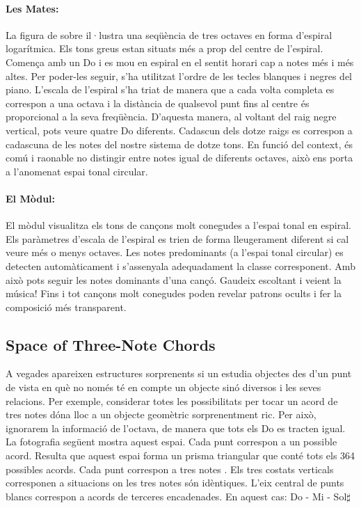 \paragraph{Les Mates:} La figura de sobre il·lustra una seqüència de tres octaves en forma d'espiral logarítmica. Els tons greus estan situats més a prop del centre de l'espiral. Comença amb un Do i es mou en espiral en el sentit horari cap a notes més i més altes. Per poder-les seguir, s'ha utilitzat l'ordre de les tecles blanques i negres del piano. L'escala de l'espiral s'ha triat de manera que a cada volta completa es correspon a una octava i la distància de qualsevol punt fins al centre és proporcional a la seva freqüència. D'aquesta manera, al voltant del raig negre vertical, pots veure quatre Do diferents. Cadascun dels dotze raigs es correspon a cadascuna de les notes del nostre sistema de dotze tons. En funció del context, és comú i raonable no distingir entre notes igual de diferents octaves, això ens porta a l'anomenat espai tonal circular.

\paragraph{El Mòdul:} El mòdul visualitza els tons de cançons molt conegudes a l'espai tonal en espiral. Els paràmetres d'escala de l'espiral es trien de forma lleugerament diferent si cal veure més o menys octaves. Les notes predominants (a l'espai tonal circular) es detecten automàticament i s'assenyala adequadament la classe corresponent. Amb això pots seguir les notes dominants d'una cançó. Gaudeix escoltant i veient la música! Fins i tot cançons molt conegudes poden revelar patrons ocults i fer la composició més transparent.

\subsection{Space of Three-Note Chords}
A vegades apareixen estructures sorprenents si un estudia objectes des d'un punt de vista en què no només té en compte un objecte sinó diversos i les seves relacions. Per exemple, considerar totes les possibilitats per tocar un acord de tres notes dóna lloc a un objecte geomètric sorprenentment ric. Per això, ignorarem la informació de l'octava, de manera que tots els Do es tracten igual. La fotografia següent mostra aquest espai. Cada punt correspon a un possible acord. Resulta que aquest espai forma un prisma triangular que conté tots els 364 possibles acords. Cada punt correspon a tres notes . Els tres costats verticals corresponen a situacions on les tres notes són idèntiques. L'eix central de punts blancs correspon a acords de terceres encadenades. En aquest cas: Do - Mi - Sol$\sharp$


